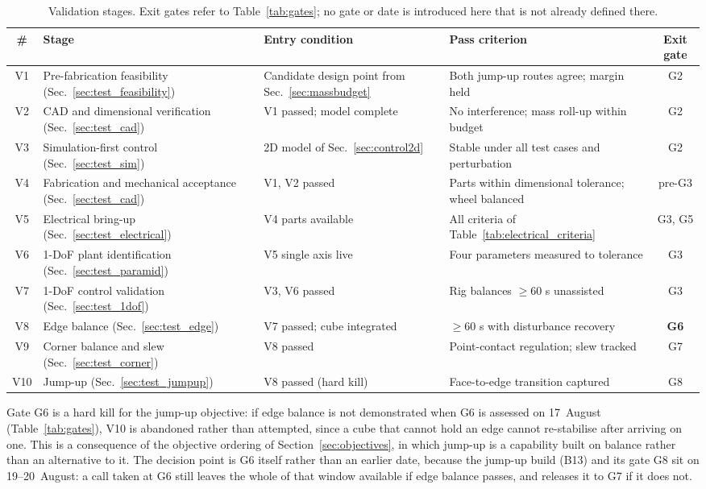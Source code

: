 \begin{table}[htbp]
\centering
\caption[Validation stages]{Validation stages. Exit gates refer to Table~\ref{tab:gates}; no gate
or date is introduced here that is not already defined there.}
\label{tab:validation_stages}
\small
\setlength{\tabcolsep}{4pt}
\begin{tabular}{c L{3.5cm} L{4.3cm} L{3.4cm} c}
\toprule
\# & Stage & Entry condition & Pass criterion & Exit gate \\
\midrule
V1  & Pre-fabrication feasibility (Sec.~\ref{sec:test_feasibility}) & Candidate design point from Sec.~\ref{sec:massbudget} & Both jump-up routes agree; margin held & G2 \\
V2  & CAD and dimensional verification (Sec.~\ref{sec:test_cad}) & V1 passed; model complete & No interference; mass roll-up within budget & G2 \\
V3  & Simulation-first control (Sec.~\ref{sec:test_sim}) & 2D model of Sec.~\ref{sec:control2d} & Stable under all test cases and perturbation & G2 \\
V4  & Fabrication and mechanical acceptance (Sec.~\ref{sec:test_cad}) & V1, V2 passed & Parts within dimensional tolerance; wheel balanced & pre-G3 \\
V5  & Electrical bring-up (Sec.~\ref{sec:test_electrical}) & V4 parts available & All criteria of Table~\ref{tab:electrical_criteria} & G3, G5 \\
V6  & 1-DoF plant identification (Sec.~\ref{sec:test_paramid}) & V5 single axis live & Four parameters measured to tolerance & G3 \\
V7  & 1-DoF control validation (Sec.~\ref{sec:test_1dof}) & V3, V6 passed & Rig balances $\geq$60 s unassisted & G3 \\
V8  & Edge balance (Sec.~\ref{sec:test_edge}) & V7 passed; cube integrated & $\geq$60 s with disturbance recovery & \textbf{G6} \\
V9  & Corner balance and slew (Sec.~\ref{sec:test_corner}) & V8 passed & Point-contact regulation; slew tracked & G7 \\
V10 & Jump-up (Sec.~\ref{sec:test_jumpup}) & V8 passed (hard kill) & Face-to-edge transition captured & G8 \\
\bottomrule
\end{tabular}
\end{table}

Gate G6 is a hard kill for the jump-up objective: if edge balance is not
demonstrated when G6 is assessed on 17~August (Table~\ref{tab:gates}), V10 is
abandoned rather than attempted, since a cube that cannot hold an edge cannot
re-stabilise after arriving on one. This is a consequence of the objective
ordering of Section~\ref{sec:objectives}, in which jump-up is a capability built
on balance rather than an alternative to it. The decision point is G6 itself
rather than an earlier date, because the jump-up build (B13) and its gate G8 sit
on 19--20~August: a call taken at G6 still leaves the whole of that window
available if edge balance passes, and releases it to G7 if it does not.

